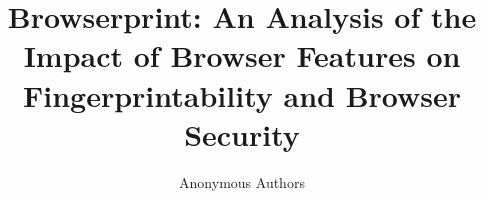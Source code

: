 \documentclass[runningheads]{llncs}
\begin{document}
\title{Browserprint: An Analysis of the Impact of Browser Features on Fingerprintability and Browser Security}


\author{Anonymous Authors}

\UseRawInputEncoding
\maketitle











\end{document}
